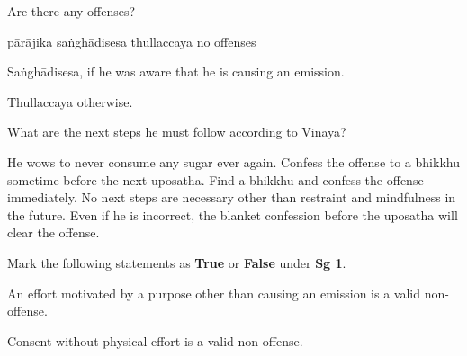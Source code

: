 \begin{exam}{\autoExamName}
\begin{problem*}
  \begin{parts}

  \item Are there any offenses?

  \bigskip

  \begin{answers}{4}
    \bChoices
     pārājika\eAns
     saṅghādisesa\eAns
     thullaccaya\eAns
     no offenses\eAns
    \eChoices
  \end{answers}

  \begin{solution}
    Saṅghādisesa, if he was aware that he is causing an emission.

    Thullaccaya otherwise.
  \end{solution}

  \bigskip

  \item What are the next steps he must follow according to Vinaya?

  \begin{manswers}{1}
    \bChoices
     He wows to never consume any sugar ever again.\eAns
     Confess the offense to a bhikkhu sometime before the next uposatha.\eAns
     Find a bhikkhu and confess the offense immediately.\eAns
     No next steps are necessary other than restraint and mindfulness in the future. Even if he is incorrect, the blanket confession before the uposatha will clear the offense.\eAns
    \eChoices
  \end{manswers}

  \end{parts}

\end{problem*}

\ifnosolutions
\clearpage
\fi

\begin{problem*}

  Mark the following statements as \textbf{True} or \textbf{False} under \textbf{Sg 1}.

  \bigskip

  \begin{parts}

    \item {} An effort motivated by a purpose other than causing an emission is a valid non-offense.

    \bigskip

    \item {} Consent without physical effort is a valid non-offense.


\end{parts}
\end{problem*}
\end{exam}
